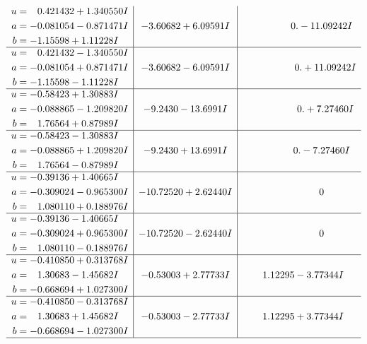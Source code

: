 \documentclass[1p]{elsarticle_modified}
\theoremstyle{definition}
\begin{document}
$$\begin{array}{c|c|c}
\begin{aligned}
u &= \phantom{-}0.421432 + 1.340550 I \\
a &= -0.081054 - 0.871471 I \\
b &= -1.15598 + 1.11228 I\end{aligned}
 & -3.60682 + 6.09591 I & \phantom{-0.000000 } 0. - 11.09242 I \\ \hline\begin{aligned}
u &= \phantom{-}0.421432 - 1.340550 I \\
a &= -0.081054 + 0.871471 I \\
b &= -1.15598 - 1.11228 I\end{aligned}
 & -3.60682 - 6.09591 I & \phantom{-0.000000 -}0. + 11.09242 I \\ \hline\begin{aligned}
u &= -0.58423 + 1.30883 I \\
a &= -0.088865 - 1.209820 I \\
b &= \phantom{-}1.76564 + 0.87989 I\end{aligned}
 & -9.2430 - 13.6991 I & \phantom{-0.000000 -}0. + 7.27460 I \\ \hline\begin{aligned}
u &= -0.58423 - 1.30883 I \\
a &= -0.088865 + 1.209820 I \\
b &= \phantom{-}1.76564 - 0.87989 I\end{aligned}
 & -9.2430 + 13.6991 I & \phantom{-0.000000 } 0. - 7.27460 I \\ \hline\begin{aligned}
u &= -0.39136 + 1.40665 I \\
a &= -0.309024 - 0.965300 I \\
b &= \phantom{-}1.080110 + 0.188976 I\end{aligned}
 & -10.72520 + 2.62440 I & \phantom{-0.000000 } 0 \\ \hline\begin{aligned}
u &= -0.39136 - 1.40665 I \\
a &= -0.309024 + 0.965300 I \\
b &= \phantom{-}1.080110 - 0.188976 I\end{aligned}
 & -10.72520 - 2.62440 I & \phantom{-0.000000 } 0 \\ \hline\begin{aligned}
u &= -0.410850 + 0.313768 I \\
a &= \phantom{-}1.30683 - 1.45682 I \\
b &= -0.668694 + 1.027300 I\end{aligned}
 & -0.53003 + 2.77733 I & \phantom{-}1.12295 - 3.77344 I \\ \hline\begin{aligned}
u &= -0.410850 - 0.313768 I \\
a &= \phantom{-}1.30683 + 1.45682 I \\
b &= -0.668694 - 1.027300 I\end{aligned}
 & -0.53003 - 2.77733 I & \phantom{-}1.12295 + 3.77344 I\\
 \hline 
 \end{array}$$\newpage\newpage\renewcommand{\arraystretch}{1}
\end{document}
